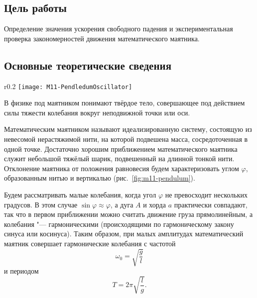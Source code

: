\documentclass[a4paper, 12pt]{extarticle}
\begin{document}
\MTDTitlePage
\MTDInfoPage

\setcounter{section}{11}

\subsection{Цель работы}
Определение значения ускорения свободного падения и экспериментальная проверка закономерностей движения математического маятника.

\subsection{Основные теоретические сведения}

\begin{wrapfigure}{r}{0.2\textwidth}
 \centering
\texttt{[image: M11-PendledumOscillator]}
\caption{\label{fig:m11-pendulum}}
\end{wrapfigure}

В физике под маятником понимают твёрдое тело, совершающее под действием силы тяжести колебания вокруг неподвижной точки или оси.

Математическим маятником называют идеализированную систему, состоящую из невесомой нерастяжимой нити, на которой подвешена масса, сосредоточенная в одной точке. Достаточно хорошим приближением математического маятника служит небольшой тяжёлый шарик, подвешенный на длинной тонкой нити. Отклонение маятника от положения равновесия будем характеризовать углом $\varphi$, образованным нитью и вертикалью (рис.~\ref{fig:m11-pendulum}). %

Будем рассматривать малые колебания, когда угол $\varphi$ не превосходит нескольких градусов. В этом случае $\sin \varphi \approx \varphi$, а дуга $A$ и хорда $a$ практически совпадают, так что в первом приближении можно считать движение груза прямолинейным, а колебания "--- гармоническими (происходящими по гармоническому закону синуса или косинуса). Таким образом, при малых амплитудах математический маятник совершает гармонические колебания с частотой \[\omega_0 = \sqrt{\frac{g}{l}}\] и периодом \[T = 2 \pi \sqrt{\frac{l}{g}}.\] %
\end{document}
